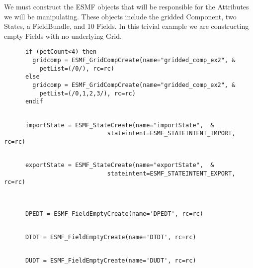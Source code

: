      We must construct the ESMF objects that will be responsible for the
      Attributes we will be manipulating.  These objects include the
      gridded Component, two States, a FieldBundle, and 10 Fields.  In this trivial
      example we are constructing empty Fields with no underlying Grid. 

 \begin{verbatim}
      if (petCount<4) then
        gridcomp = ESMF_GridCompCreate(name="gridded_comp_ex2", &
          petList=(/0/), rc=rc)
      else
        gridcomp = ESMF_GridCompCreate(name="gridded_comp_ex2", &
          petList=(/0,1,2,3/), rc=rc)
      endif
 
\end{verbatim}
 

 \begin{verbatim}
      importState = ESMF_StateCreate(name="importState",  &
                             stateintent=ESMF_STATEINTENT_IMPORT, rc=rc)
 
\end{verbatim}
 

 \begin{verbatim}
      exportState = ESMF_StateCreate(name="exportState",  &
                             stateintent=ESMF_STATEINTENT_EXPORT, rc=rc)
 
\end{verbatim}
 

 \begin{verbatim}

      DPEDT = ESMF_FieldEmptyCreate(name='DPEDT', rc=rc)
 
\end{verbatim}
 

 \begin{verbatim}
      DTDT = ESMF_FieldEmptyCreate(name='DTDT', rc=rc)
 
\end{verbatim}
 

 \begin{verbatim}
      DUDT = ESMF_FieldEmptyCreate(name='DUDT', rc=rc)
 
\end{verbatim}
 
